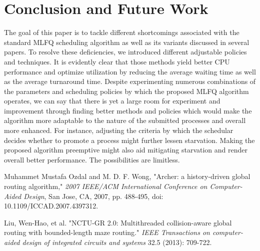 \documentclass[conference]{IEEEtran}
\begin{document}

\section{Conclusion and Future Work}

The goal of this paper is to tackle different shortcomings associated with the standard MLFQ scheduling algorithm as well as its variants discussed in several papers. To resolve these deficiencies, we introduced different adjustable policies and techniques. It is evidently clear that those methods yield better CPU performance and optimize utilization by reducing the average waiting time as well as the average turnaround time. Despite experimenting numerous combinations of the parameters and scheduling policies by which the proposed MLFQ algorithm operates, we can say that there is yet a large room for experiment and improvement through finding better methods and policies which would make the algorithm more adaptable to the nature of the submitted processes and overall more enhanced. For instance, adjusting the criteria by which the schedular decides whether to promote a process might further lessen starvation. Making the proposed algorithm preemptive might also aid mitigating starvation and render overall better performance. The possibilities are limitless.


\begin{thebibliography}{00}

 Muhammet Mustafa Ozdal and M. D. F. Wong, "Archer: a history-driven global routing algorithm," \textit{2007 IEEE/ACM International Conference on Computer-Aided Design}, San Jose, CA, 2007, pp. 488-495, doi: 10.1109/ICCAD.2007.4397312.

 Liu, Wen-Hao, et al. "NCTU-GR 2.0: Multithreaded collision-aware global routing with bounded-length maze routing." \textit{IEEE Transactions on computer-aided design of integrated circuits and systems} 32.5 (2013): 709-722.


\end{thebibliography}
\end{document}
